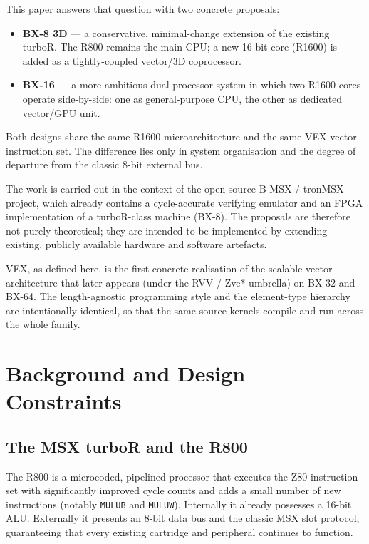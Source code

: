 \documentclass[11pt,a4paper]{article}
\begin{document}
This paper answers that question with two concrete proposals:

\begin{itemize}
    \item \textbf{BX-8 3D} --- a conservative, minimal-change extension of the existing turboR. The R800 remains the main CPU; a new 16-bit core (R1600) is added as a tightly-coupled vector/3D coprocessor.
    \item \textbf{BX-16} --- a more ambitious dual-processor system in which two R1600 cores operate side-by-side: one as general-purpose CPU, the other as dedicated vector/GPU unit.
\end{itemize}

Both designs share the same R1600 microarchitecture and the same VEX vector instruction set. The difference lies only in system organisation and the degree of departure from the classic 8-bit external bus.

The work is carried out in the context of the open-source B-MSX / tronMSX project, which already contains a cycle-accurate verifying emulator and an FPGA implementation of a turboR-class machine (BX-8). The proposals are therefore not purely theoretical; they are intended to be implemented by extending existing, publicly available hardware and software artefacts.

VEX, as defined here, is the first concrete realisation of the scalable vector architecture that later appears (under the RVV / Zve* umbrella) on BX-32 and BX-64. The length-agnostic programming style and the element-type hierarchy are intentionally identical, so that the same source kernels compile and run across the whole family.

\section{Background and Design Constraints}

\subsection{The MSX turboR and the R800}

The R800 is a microcoded, pipelined processor that executes the Z80 instruction set with significantly improved cycle counts and adds a small number of new instructions (notably \texttt{MULUB} and \texttt{MULUW}). Internally it already possesses a 16-bit ALU. Externally it presents an 8-bit data bus and the classic MSX slot protocol, guaranteeing that every existing cartridge and peripheral continues to function.
\end{document}
